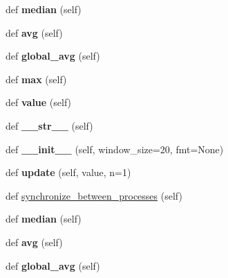 \begin{DoxyCompactItemize}
def {\bfseries median} (self)
\item 
\mbox{\label{classutils_1_1SmoothedValue_a17cc6f86030d87fe010925409bc1ed2a}} 
def {\bfseries avg} (self)
\item 
\mbox{\label{classutils_1_1SmoothedValue_a36a8e70157cd8708141835f19b5d972d}} 
def {\bfseries global\+\_\+avg} (self)
\item 
\mbox{\label{classutils_1_1SmoothedValue_a158b58316c2fce950e45973acd514523}} 
def {\bfseries max} (self)
\item 
\mbox{\label{classutils_1_1SmoothedValue_a102baf7191d54900fc448004a41f4da5}} 
def {\bfseries value} (self)
\item 
\mbox{\label{classutils_1_1SmoothedValue_ad4cc419248d1d78c567600ecf8236e6a}} 
def {\bfseries \+\_\+\+\_\+str\+\_\+\+\_\+} (self)
\item 
\mbox{\label{classutils_1_1SmoothedValue_ae3f395e1967e26ff15efbdd5149dc1ee}} 
def {\bfseries \+\_\+\+\_\+init\+\_\+\+\_\+} (self, window\+\_\+size=20, fmt=None)
\item 
\mbox{\label{classutils_1_1SmoothedValue_ad907a5758d104cef55dbc7056f29d6e4}} 
def {\bfseries update} (self, value, n=1)
\item 
def \hyperlink{classutils_1_1SmoothedValue_a8d10c867abf46adb6b0be5b6adcf1236}{synchronize\+\_\+between\+\_\+processes} (self)
\item 
\mbox{\label{classutils_1_1SmoothedValue_ab3e14bcdb1429898324595abbf30ec07}} 
def {\bfseries median} (self)
\item 
\mbox{\label{classutils_1_1SmoothedValue_a17cc6f86030d87fe010925409bc1ed2a}} 
def {\bfseries avg} (self)
\item 
\mbox{\label{classutils_1_1SmoothedValue_a36a8e70157cd8708141835f19b5d972d}} 
def {\bfseries global\+\_\+avg} (self)
\item 

\end{DoxyCompactItemize}
